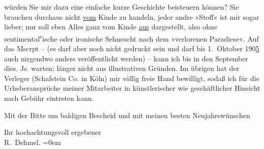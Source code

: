 \pstart
           {\pb}würden Sie mir dazu eine einfache kurze Geschichte
               beisteuern können? Sie brauchen durchaus nicht \uline{vom}
               Kinde zu handeln, jeder andre »Stoff« ist mir sogar lieber; nur soll eben Alles ganz
               vom Kinde \uline{aus} dargestellt, also ohne sentimental\substVorne{}\textsuperscript{e}\substDazwischen{}ische\substHinten{} oder ironische Sehnsucht nach dem »verlorenen Paradiese«. Auf das Mscrpt –
               (es darf aber noch nicht gedruckt sein und darf bis 1. Oktober 190\uline{5} auch nirgendwo anders veröffentlicht werden) – kann ich bis in den
                  September dies. Js. warten; länger {\pb}nicht
               aus illustrativen Gründen. Im übrigen hat der Verleger (Schafstein {\kaufmannsund} Co. in Köln) mir völlig freie Hand bewilligt, sodaß ich
               für die Urheberansprüche meiner Mitarbeiter in künstlerischer wie geschäftlicher
               Hinsicht nach Gebühr eintreten kann.\pend
           
\pstart
           Mit der Bitte um baldigen Bescheid und mit meinen besten Neujahrswünschen\pend
           
\pstart
           Ihr hochachtungsvoll ergebener{\\[\baselineskip]}\spacefill\mbox{R. Dehmel.}\pend
           \leftskip=0em{}\endnumbering{}  \newcommand{\dateiname}{L01194}\newcommand{\titel}{Richard Dehmel an Arthur Schnitzler, 1. 1. 1902}\newcommand{\editorInnen}{Martin Anton Müller und Gerd-Hermann Susen}
